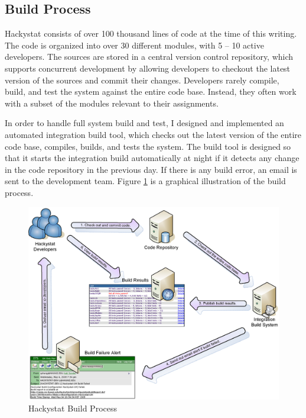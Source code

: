 
\subsection{Build Process}

Hackystat consists of over 100 thousand lines of code at the time of this writing. The code is organized into over 30 different modules, with 5 -- 10 active developers. The sources are stored in a central version control repository, which supports concurrent development by allowing developers to checkout the latest version of the sources and commit their changes. Developers rarely compile, build, and test the system against the entire code base. Instead, they often work with a subset of the modules relevant to their assignments. 

In order to handle full system build and test, I designed and implemented an automated integration build tool, which checks out the latest version of the entire code base, compiles, builds, and tests the system. The build tool is designed so that it starts the integration build automatically at night if it detects any change in the code repository in the previous day. If there is any build error, an email is sent to the development team. Figure \ref{fig:BuildProcess} is a graphical illustration of the build process.

\begin{figure}[p]
  \centering
  \includegraphics[width=1.00\textwidth]{figures/BuildProcess}
  \caption{Hackystat Build Process}
  \label{fig:BuildProcess}
\end{figure}


